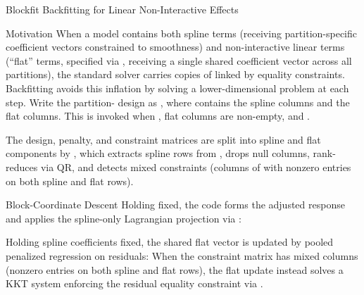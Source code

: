 %
\begin{Section}{Blockfit Backfitting for Linear Non-Interactive Effects}


%
\begin{SubSection}{Motivation}
When a model contains both spline terms (receiving 
partition-specific coefficient vectors constrained to smoothness) and
non-interactive linear terms (``flat'' terms, specified via
, receiving a single shared
coefficient vector  across all partitions), the standard
solver carries  copies of  linked by equality
constraints. Backfitting avoids this inflation by solving a
lower-dimensional problem at each step. Write the partition-
design as
, where  contains
the spline columns and  the flat
columns. This is invoked when , flat columns are
non-empty, and .

The design, penalty, and constraint matrices are split into spline and
flat components by , which extracts
spline rows from , drops null columns, rank-reduces via
QR, and detects mixed constraints (columns of  with
nonzero entries on both spline and flat rows).
\end{SubSection}


%
\begin{SubSection}{Block-Coordinate Descent}
 Holding  fixed, the code forms
the adjusted response
 and
applies the spline-only Lagrangian projection via
:

 Holding spline coefficients fixed, the shared flat
vector is updated by pooled penalized regression on residuals:
When the constraint matrix  has mixed columns (nonzero
entries on both spline and flat rows), the flat update instead solves a
KKT system enforcing the residual equality constraint
via .


\end{SubSection}
\end{Section}
